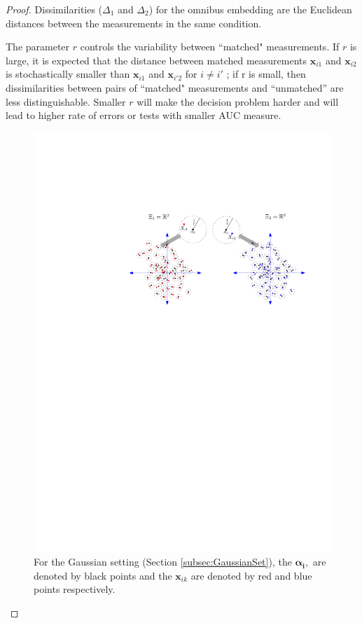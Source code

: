\documentclass[12pt]{article} %
\begin{document}
\begin{proof}
 Dissimilarities ($\Delta_1$ and  $\Delta_2$) for the omnibus embedding are the Euclidean distances between the measurements in the same condition.
 
The parameter $r$ controls the variability between ``matched" measurements. If $r$ is large, it is expected that the distance between matched measurements
$\bm{x}_{i1}$ and $\bm{x}_{i2}$ is stochastically smaller than $\bm{x}_{i1}$ and $\bm{x}_{i'2}$ for $i \neq i'$ ; if r is small, then dissimilarities  between pairs of ``matched"  measurements and 
``unmatched'' are less distinguishable. Smaller $r$ will make the decision problem harder and will lead to higher rate of errors or tests with smaller AUC measure.

    \begin{figure}
	\begin{center}
    \includegraphics[scale=0.55]{MVN_alpha_r_multiple_sancar.pdf}
    \caption{For the  Gaussian setting (Section \ref{subsec:GaussianSet}), the $\bm{\alpha_i},$ are denoted by black points and the $\bm{x}_{ik}$ are denoted by red and blue points respectively.}
\label{fig:Fig1}
	\end{center}
  \end{figure}


\end{proof}
\end{document}
